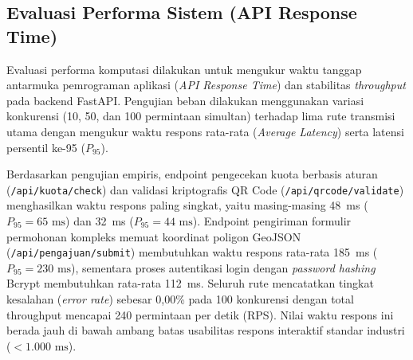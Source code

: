 ﻿\documentclass[conference]{IEEEtran}
\begin{document}
\subsection{Evaluasi Performa Sistem (API Response Time)}
Evaluasi performa komputasi dilakukan untuk mengukur waktu tanggap antarmuka pemrograman aplikasi (\textit{API Response Time}) dan stabilitas \textit{throughput} pada backend FastAPI. Pengujian beban dilakukan menggunakan variasi konkurensi (10, 50, dan 100 permintaan simultan) terhadap lima rute transmisi utama dengan mengukur waktu respons rata-rata (\textit{Average Latency}) serta latensi persentil ke-95 ($P_{95}$).

Berdasarkan pengujian empiris, endpoint pengecekan kuota berbasis aturan (\texttt{/api/kuota/check}) dan validasi kriptografis QR Code (\texttt{/api/qrcode/validate}) menghasilkan waktu respons paling singkat, yaitu masing-masing 48~ms ($P_{95} = 65\text{~ms}$) dan 32~ms ($P_{95} = 44\text{~ms}$). Endpoint pengiriman formulir permohonan kompleks memuat koordinat poligon GeoJSON (\texttt{/api/pengajuan/submit}) membutuhkan waktu respons rata-rata 185~ms ($P_{95} = 230\text{~ms}$), sementara proses autentikasi login dengan \textit{password hashing} Bcrypt membutuhkan rata-rata 112~ms. Seluruh rute mencatatkan tingkat kesalahan (\textit{error rate}) sebesar 0,00\% pada 100 konkurensi dengan total throughput mencapai 240 permintaan per detik (RPS). Nilai waktu respons ini berada jauh di bawah ambang batas usabilitas respons interaktif standar industri ($< 1.000\text{~ms}$).

\begin{table}[htbp]
\caption{Waktu Tanggap dan Kinerja RESTful API FastAPI}
\begin{center}
\label{tab:api_performance}
\end{center}
\end{table}
\end{document}
